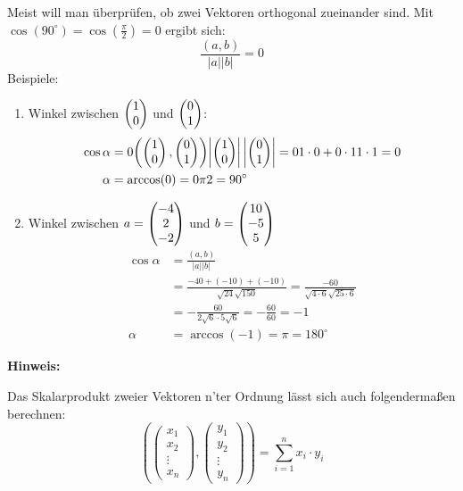 		\noindent Meist will man überprüfen, ob zwei Vektoren orthogonal zueinander sind. Mit \\
		$\cos(90^\circ) = \cos(\frac{\pi}{2}) = 0$ ergibt sich:
		\begin{equation*}
			\frac{(a,b)}{|a||b|} = 0
		\end{equation*}
	\newpage
		Beispiele:
		\begin{enumerate}
			\item Winkel zwischen $\vect1,0$ und $\vect0,1$:
			\begin{align*}
				\cos\alpha &=
				\frac{\left(\vect1,0,\vect0,1\right)}{\left|\vect1,0\right|\left|\vect0,
				1\right| }
				= \frac{1\cdot0+0\cdot1}{1\cdot1} = 0\\
				\alpha &= \arccos(0) = \frac{\pi}{2} = 90^\circ 
			\end{align*}
			
			\item Winkel zwischen $a= \left(\!\!\!\begin{array}{c}-4\\2\\-2 \end{array}\!\!\!\right)$ und $b=\left(\!\!\!\begin{array}{c}10\\-5\\5 \end{array}\!\!\!\right)$
			\begin{align*}
				\cos\alpha &= \frac{\left(a, b\right)}{|a||b|}\\
				            &= \frac{-40+(-10)+(-10)}{\sqrt{24}\sqrt{150}} 
				            = \frac{-60}{\sqrt{4\cdot6}\sqrt{25\cdot6}} \\
				            &= -\frac{60}{2\sqrt{6}\cdot 5\sqrt{6}} = -\frac{60}{60} = -1\\
				\alpha      &= \arccos(-1) = \pi = 180^\circ
			\end{align*}
	
		\end{enumerate}
		
		\textbf{Hinweis:}
		
		 Das Skalarprodukt zweier Vektoren n'ter Ordnung lässt sich auch folgendermaßen berechnen:\\
		\[ (\left( \begin{array}{l}
				x_{1} \\
				x_{2} \\
				\vdots \\
				x_{n}				
			\end{array} \right) ,
			\left( \begin{array}{l}
				y_{1} \\
				y_{2} \\
				\vdots \\
				y_{n}				
			\end{array} \right) )
			=
			\sum_{i=1}^{n} x_{i} \cdot y_{i}
		\]
	
